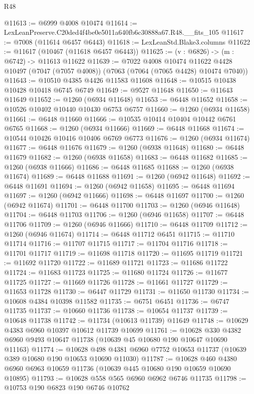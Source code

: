 \begin{lexlean}{R48}
\begin{coremodule}
@11613 := @6999 @4008 @10474
@11614 := LexLeanPreserve.C20ded4f4be0e5011a640fb6c30888a67.R48.__fits_105
@11617 := @7008 (@11614 @6457 @6443)
@11618 := LexLeanStd.Blake3.columns
@11622 := @11617 (@10467 (@11618 @6457 @6443))
@11625 := (v : @6826) -> (m : @6742) -> @11613 @11622
@11639 := @7022
    @4008
    @10474
    @11622
    @4428
    @10497
    (@7047 (@7057 @4008))
    (@7063 (@7064 (@7065 @4428) @10474 @7040))
@11643 := @10510 @4385 @4426 @11583 @11608
@11648 := @10515 @10438 @10428 @10418 @6745 @6749
@11649 := @9527 @11648
@11650 := @11643 @11649
@11652 := @1260 (@6934 @11648)
@11653 := @6448 @11652
@11658 := @10526 @10402 @10440 @10430 @6753 @6757
@11660 := @1260 (@6934 @11658)
@11661 := @6448 @11660
@11666 := @10535 @10414 @10404 @10442 @6761 @6765
@11668 := @1260 (@6934 @11666)
@11669 := @6448 @11668
@11674 := @10544 @10426 @10416 @10406 @6769 @6773
@11676 := @1260 (@6934 @11674)
@11677 := @6448 @11676
@11679 := @1260 (@6938 @11648)
@11680 := @6448 @11679
@11682 := @1260 (@6938 @11658)
@11683 := @6448 @11682
@11685 := @1260 (@6938 @11666)
@11686 := @6448 @11685
@11688 := @1260 (@6938 @11674)
@11689 := @6448 @11688
@11691 := @1260 (@6942 @11648)
@11692 := @6448 @11691
@11694 := @1260 (@6942 @11658)
@11695 := @6448 @11694
@11697 := @1260 (@6942 @11666)
@11698 := @6448 @11697
@11700 := @1260 (@6942 @11674)
@11701 := @6448 @11700
@11703 := @1260 (@6946 @11648)
@11704 := @6448 @11703
@11706 := @1260 (@6946 @11658)
@11707 := @6448 @11706
@11709 := @1260 (@6946 @11666)
@11710 := @6448 @11709
@11712 := @1260 (@6946 @11674)
@11714 := @6448 @11712 @6451
@11715 := @11710 @11714
@11716 := @11707 @11715
@11717 := @11704 @11716
@11718 := @11701 @11717
@11719 := @11698 @11718
@11720 := @11695 @11719
@11721 := @11692 @11720
@11722 := @11689 @11721
@11723 := @11686 @11722
@11724 := @11683 @11723
@11725 := @11680 @11724
@11726 := @11677 @11725
@11727 := @11669 @11726
@11728 := @11661 @11727
@11729 := @11653 @11728
@11730 := @6447 @11729
@11731 := @11650 @11730
@11734 := @10608 @4384 @10398 @11582
@11735 := @6751 @6451
@11736 := @6747 @11735
@11737 := @10660 @11736
@11738 := @10654 @11737
@11739 := @10648 @11738
@11742 := @11734 (@10613 @11739) @11649
@11748 := @10629 @4383 @6960 @10397 @10612 @11739 @10699
@11761 := @10628 @330 @4382 @6960 @9493 @10647 @11738 (@10639 @45 @10680 @190 @10647 @10690 @11163)
@11774 := @10628 @498 @4381 @6960 @7752 @10653 @11737 (@10639 @389 @10680 @190 @10653 @10690 @11030)
@11787 := @10628 @460 @4380 @6960 @6963 @10659 @11736 (@10639 @445 @10680 @190 @10659 @10690 @10895)
@11793 := @10628 @558 @565 @6960 @6962 @6746 @11735
@11798 := @10753 @190 @6823 @190 @6746 @10762

\end{coremodule}
\end{lexlean}
